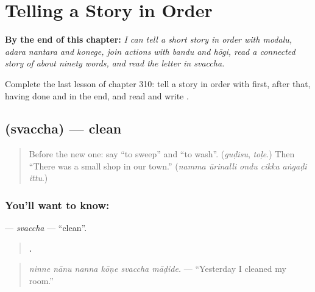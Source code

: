 
\chapter{Telling a Story in Order}
\label{ch:ka-telling-a-story-in-order}

\begin{chapteropening}
\textbf{By the end of this chapter:} \emph{I can tell a short story in order with modalu, adara nantara and konege, join actions with bandu and hōgi, read a connected story of about ninety words, and read the letter  in svaccha.}

Complete the last lesson of chapter 310: tell a story in order with first, after that, having done and in the end, and read and write .
\end{chapteropening}

\section[\texorpdfstring{\kn{ಸ್ವಚ್ಛ} (svaccha)}{ಸ್ವಚ್ಛ (svaccha)}]{ (svaccha) — clean}

\label{lesson:KA-C310-svaccha}



\begin{quote}
Before the new one: say \textquotedblleft{}to sweep\textquotedblright{} and \textquotedblleft{}to wash\textquotedblright{}. (\emph{guḍisu}, \emph{toḷe}.) Then \textquotedblleft{}There was a small shop in our town.\textquotedblright{} (\emph{namma ūrinalli ondu cikka aṅgaḍi ittu}.)
\end{quote}

\subsection*{You'll want to know: }
\textbf{} — \emph{svaccha} — \textquotedblleft{}clean\textquotedblright{}.

\begin{quote}
\textbf{     .}
\end{quote}

\begin{quote}
\emph{ninne nānu nanna kōṇe svaccha māḍide.} — \textquotedblleft{}Yesterday I cleaned my room.\textquotedblright{}
\end{quote}

